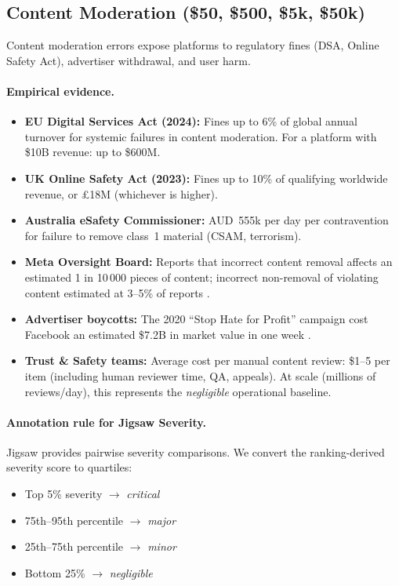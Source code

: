 \subsection{Content Moderation (\$50, \$500, \$5k, \$50k)}

Content moderation errors expose platforms to regulatory fines
(DSA, Online Safety Act), advertiser withdrawal, and user harm.

\paragraph{Empirical evidence.}
\begin{itemize}
\item \textbf{EU Digital Services Act (2024):} Fines up to 6\% of
    global annual turnover for systemic failures in content moderation.
    For a platform with \$10B revenue: up to \$600M.
\item \textbf{UK Online Safety Act (2023):} Fines up to 10\% of
    qualifying worldwide revenue, or \pounds18M (whichever is higher).
\item \textbf{Australia eSafety Commissioner:} AUD~555k per day per
    contravention for failure to remove class~1 material (CSAM,
    terrorism).
\item \textbf{Meta Oversight Board:} Reports that incorrect content
    removal affects an estimated 1 in 10\,000 pieces of content;
    incorrect non-removal of violating content estimated at 3--5\%
    of reports \citep{meta2023transparency}.
\item \textbf{Advertiser boycotts:} The 2020 \enquote{Stop Hate for Profit}
    campaign cost Facebook an estimated \$7.2B in market value in
    one week \citep{reuters2020stophate}.
\item \textbf{Trust \& Safety teams:} Average cost per manual content
    review: \$1--5 per item (including human reviewer time, QA,
    appeals). At scale (millions of reviews/day), this represents
    the \textit{negligible} operational baseline.
\end{itemize}

\paragraph{Annotation rule for Jigsaw Severity.}
Jigsaw provides pairwise severity comparisons. We convert the
ranking-derived severity score to quartiles:
\begin{itemize}
\item Top 5\% severity $\to$ \textit{critical}
\item 75th--95th percentile $\to$ \textit{major}
\item 25th--75th percentile $\to$ \textit{minor}
\item Bottom 25\% $\to$ \textit{negligible}
\end{itemize}

